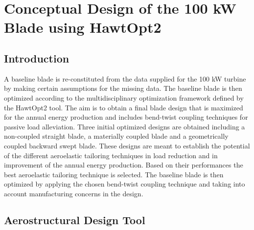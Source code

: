 
\chapter{Conceptual Design of the 100 kW Blade using HawtOpt2}

\section{Introduction}
A baseline blade is re-constituted from the data supplied for the 100 kW turbine by making certain assumptions for the missing data. The baseline blade is then optimized according to the multidisciplinary optimization framework defined by the HawtOpt2 tool. The aim is to obtain a final blade design that is maximized for the annual energy production and includes bend-twist coupling techniques for passive load alleviation. Three initial optimized designs are obtained including a non-coupled straight blade, a materially coupled blade and a geometrically coupled backward swept blade. These designs are meant to establish the potential of the different aeroelastic tailoring techniques in load reduction and in improvement of the annual energy production. Based on their performances the best aeroelastic tailoring technique is selected. The baseline blade is then optimized by applying the chosen bend-twist coupling technique and taking into account manufacturing concerns in the design.

\section{Aerostructural Design Tool}
\label{sec:blade_design_tool}




